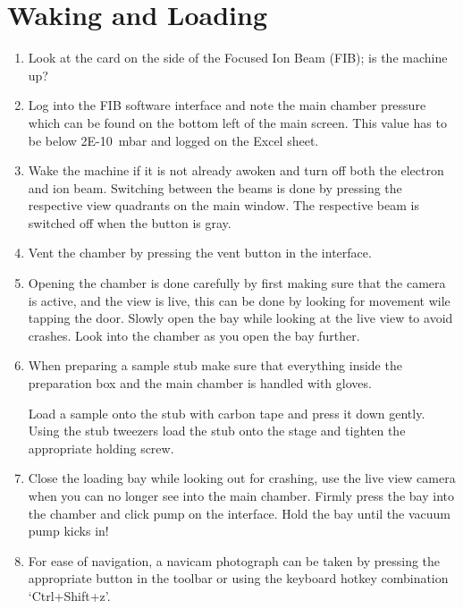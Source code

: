 \documentclass[a4paper]{scrartcl}
\begin{document}
\section*{Waking and Loading}
\begin{enumerate}
	\item Look at the card on the side of the Focused Ion Beam (FIB); is the machine up?
	\item Log into the FIB software interface and note the main chamber pressure which can be found on the bottom left of the main screen. This value has to be below \SI{2E-10}{\milli \bar} and logged on the Excel sheet.
	\item Wake the machine if it is not already awoken and turn off both the electron and ion beam. Switching between the beams is done by pressing the respective view quadrants on the main window. The respective beam is switched off when the button is gray.
	\item  Vent the chamber by pressing the vent button in the interface.
	\item Opening the chamber is done carefully by first making sure that the camera is active, and the view is live, this can be done by looking for movement wile tapping the door. Slowly open the bay while looking at the live view to avoid crashes. Look into the chamber as you open the bay further.
	\item \colorbox{warning!30}{\parbox{\linewidth}{When preparing a sample stub make sure that everything inside the preparation box and the main chamber is handled with gloves.}} Load a sample onto the stub with carbon tape and press it down gently. Using the stub tweezers load the stub onto the stage and tighten the appropriate holding screw.
	\item Close the loading bay while looking out for crashing, use the live view camera when you can no longer see into the main chamber. Firmly press the bay into the chamber and click pump on the interface. Hold the bay until the vacuum pump kicks in!
	\item For ease of navigation, a navicam photograph can be taken by pressing the appropriate button in the toolbar or using the keyboard hotkey combination `Ctrl+Shift+z'.
\end{enumerate}
\end{document}
